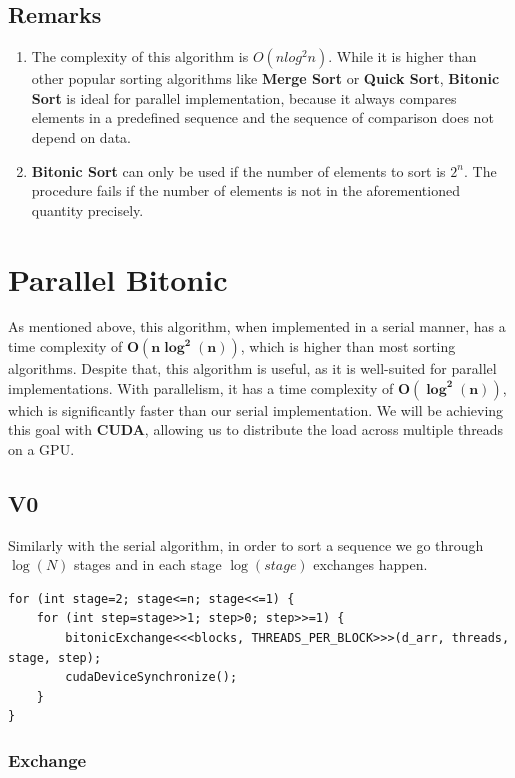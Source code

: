 \documentclass[12pt]{report}
\begin{document}
\section{Remarks}

\begin{enumerate}
\item The complexity of this algorithm is $O(nlog^2n)$. While it is higher than other popular sorting algorithms like \textbf{Merge Sort} or \textbf{Quick Sort},  \textbf{Bitonic Sort} is ideal for parallel implementation, because it always compares elements in a predefined sequence and the sequence of comparison does not depend on data. 
\item \textbf{Bitonic Sort} can only be used if the number of elements to sort is $2^n$. The procedure fails if the number of elements is not in the aforementioned quantity precisely.
\end{enumerate}
        
\chapter{Parallel Bitonic}
As mentioned above, this algorithm, when implemented in a serial manner, has a time complexity of \(\boldsymbol{O(n\log^2(n))}\), which is higher than most sorting algorithms. Despite that, this algorithm is useful, as it is well-suited for parallel implementations. With parallelism, it has a time complexity of \(\boldsymbol{O(\log^2(n))}\), which is significantly faster than our serial implementation. We will be achieving this goal with \textbf{CUDA}, allowing us to distribute the load across multiple threads on a GPU.

\section{V0}
Similarly with the serial algorithm, in order to sort a sequence we go through $\log(N)$ stages and in each stage $\log(stage)$ exchanges happen. 
\begin{lstlisting}[style=cstyle]
for (int stage=2; stage<=n; stage<<=1) {
    for (int step=stage>>1; step>0; step>>=1) {
        bitonicExchange<<<blocks, THREADS_PER_BLOCK>>>(d_arr, threads, stage, step);
        cudaDeviceSynchronize();
    }
}
\end{lstlisting}

\subsection{Exchange}
\end{document}
